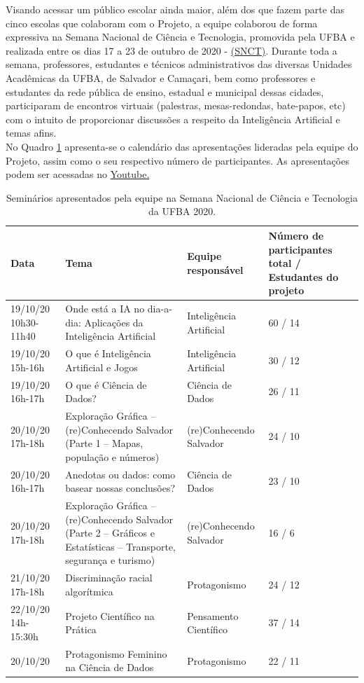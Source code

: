 \documentclass[
]{book}
\begin{document}
Visando acessar um público escolar ainda maior, além dos que fazem parte das cinco escolas que colaboram com o Projeto, a equipe colaborou de forma expressiva na Semana Nacional de Ciência e Tecnologia, promovida pela UFBA e realizada entre os dias 17 a 23 de outubro de 2020 - \href{http://www.snct.ufba.br/programacao-semana-ufba/}{(SNCT)}. Durante toda a semana, professores, estudantes e técnicos administrativos das diversas Unidades Acadêmicas da UFBA, de Salvador e Camaçari, bem como professores e estudantes da rede pública de ensino, estadual e municipal dessas cidades, participaram de encontros virtuais (palestras, mesas-redondas, bate-papos, etc) com o intuito de proporcionar discussões a respeito da Inteligência Artificial e temas afins.\\
No Quadro \ref{tab:quadro5} apresenta-se o calendário das apresentações lideradas pela equipe do Projeto, assim como o seu respectivo número de participantes. As apresentações podem ser acessadas no \href{https://www.youtube.com/playlist?list=PLdPylXX7C_XhxUyoDBxeEIOR0hbLNHbqX}{Youtube.}

\begin{table}

\caption{\label{tab:quadro5}Seminários apresentados pela equipe na Semana Nacional de Ciência e Tecnologia da UFBA 2020.}
\centering
\begin{tabular}[t]{l|l|l|l}
\hline
Data & Tema & Equipe responsável & Número de participantes total / Estudantes do projeto\\
\hline
19/10/20 10h30-11h40 & Onde está a IA no dia-a-dia: Aplicações da Inteligência Artificial & Inteligência Artificial & 60 / 14\\
\hline
19/10/20 15h-16h & O que é Inteligência Artificial e Jogos & Inteligência Artificial & 30 / 12\\
\hline
19/10/20 16h-17h & O que é Ciência de Dados? & Ciência de Dados & 26 / 11\\
\hline
20/10/20 17h-18h & Exploração Gráfica – (re)Conhecendo Salvador (Parte 1 – Mapas, população e números) & (re)Conhecendo Salvador & 24 / 10\\
\hline
20/10/20 16h-17h & Anedotas ou dados: como basear nossas conclusões? & Ciência de Dados & 23 / 10\\
\hline
20/10/20 17h-18h & Exploração Gráfica – (re)Conhecendo Salvador (Parte 2 – Gráficos e Estatísticas – Transporte, segurança e turismo) & (re)Conhecendo Salvador & 16 / 6\\
\hline
21/10/20 17h-18h & Discriminação racial algorítmica & Protagonismo & 24 / 12\\
\hline
22/10/20 14h-15:30h & Projeto Científico na Prática & Pensamento Científico & 37 / 14\\
\hline
20/10/20 & Protagonismo Feminino na Ciência de Dados & Protagonismo & 22 / 11\\
\hline
\end{tabular}
\end{table}
\end{document}
